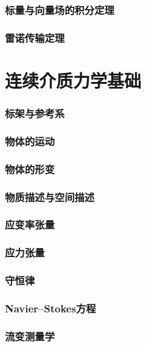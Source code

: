 \documentclass[zihao=-4,linespread=1.5,heading=true,a4paper,twoside]{ctexart}
\begin{document}
\section{标量与向量场的积分定理}

\section{雷诺传输定理}

\newpage\part{连续介质力学基础}
\section{标架与参考系}


\section{物体的运动}


\section{物体的形变}


\section{物质描述与空间描述}


\section{应变率张量}



\section{应力张量}

\section{守恒律}

\section{Navier--Stokes方程}

\section{流变测量学}
\end{document}
